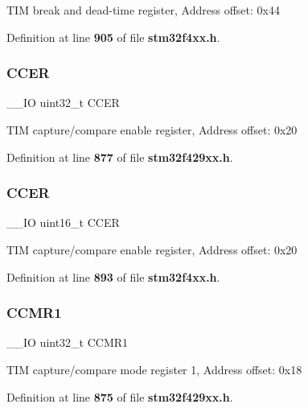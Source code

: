 T\+IM break and dead-\/time register, Address offset\+: 0x44 

Definition at line \textbf{ 905} of file \textbf{ stm32f4xx.\+h}.

\mbox{\label{structTIM__TypeDef_a098110becfef10e1fd1b6a4f874da496}} 
\subsubsection{C\+C\+ER\hspace{0.1cm}{\footnotesize\ttfamily [1/2]}}
{\footnotesize\ttfamily \+\_\+\+\_\+\+IO uint32\+\_\+t C\+C\+ER}

T\+IM capture/compare enable register, Address offset\+: 0x20 

Definition at line \textbf{ 877} of file \textbf{ stm32f429xx.\+h}.

\mbox{\label{structTIM__TypeDef_ab1da3e84848ed66e0577c87c199bfb6d}} 
\subsubsection{C\+C\+ER\hspace{0.1cm}{\footnotesize\ttfamily [2/2]}}
{\footnotesize\ttfamily \+\_\+\+\_\+\+IO uint16\+\_\+t C\+C\+ER}

T\+IM capture/compare enable register, Address offset\+: 0x20 

Definition at line \textbf{ 893} of file \textbf{ stm32f4xx.\+h}.

\mbox{\label{structTIM__TypeDef_adb72f64492a75e780dd2294075c70fed}} 
\subsubsection{C\+C\+M\+R1\hspace{0.1cm}{\footnotesize\ttfamily [1/2]}}
{\footnotesize\ttfamily \+\_\+\+\_\+\+IO uint32\+\_\+t C\+C\+M\+R1}

T\+IM capture/compare mode register 1, Address offset\+: 0x18 

Definition at line \textbf{ 875} of file \textbf{ stm32f429xx.\+h}.

